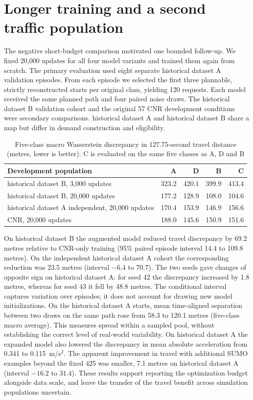 \section{Longer training and a second traffic population}
The negative short-budget comparison motivated one bounded follow-up. We fixed 20,000 updates for all four model variants and trained them again from scratch. The primary evaluation used eight separate historical dataset A validation episodes. From each episode we selected the first three plannable, strictly reconstructed starts per original class, yielding 120 requests. Each model received the same planned path and four paired noise draws. The historical dataset B validation cohort and the original 57 CNR development conditions were secondary comparisons. historical dataset A and historical dataset B share a map but differ in demand construction and eligibility.

\begin{table}[htbp]
\centering\small
\caption{Five-class macro Wasserstein discrepancy in 127.75-second travel distance (metres, lower is better). C is evaluated on the same five classes as A, D and B}
\begin{tabular}{lrrrr}\toprule
Development population & A & D & B & C\\\midrule
historical dataset B, 3,000 updates & 323.2 & 420.1 & 399.9 & 413.4\\
historical dataset B, 20,000 updates & 177.2 & 128.9 & 108.0 & 104.6\\
historical dataset A independent, 20,000 updates & 170.4 & 153.9 & 146.9 & 156.6\\
CNR, 20,000 updates & 188.0 & 145.6 & 150.9 & 151.6\\\bottomrule
\end{tabular}
\end{table}

On historical dataset B the augmented model reduced travel discrepancy by 69.2 metres relative to CNR-only training (95\% paired episode interval 14.4 to 109.8 metres). On the independent historical dataset A cohort the corresponding reduction was 23.5 metres (interval $-6.4$ to $70.7$). The two seeds gave changes of opposite sign on historical dataset A: for seed 42 the discrepancy increased by 1.8 metres, whereas for seed 43 it fell by 48.8 metres. The conditional interval captures variation over episodes; it does not account for drawing new model initializations. On the historical dataset A starts, mean time-aligned separation between two draws on the same path rose from 58.3 to 120.1 metres (five-class macro average). This measures spread within a sampled pool, without establishing the correct level of real-world variability. On historical dataset A the expanded model also lowered the discrepancy in mean absolute acceleration from 0.341 to 0.115~m/s$^2$. The apparent improvement in travel with additional SUMO examples beyond the fixed 425 was smaller, 7.1 metres on historical dataset A (interval $-16.2$ to $31.4$). These results support reporting the optimization budget alongside data scale, and leave the transfer of the travel benefit across simulation populations uncertain.

